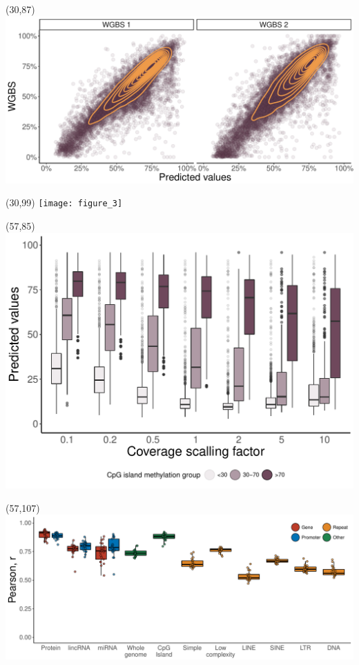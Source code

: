 \documentclass[a0,50pt]{a0poster}
\begin{document}
    \begin{textblock}{0}(30,87)
        \includegraphics{figure_2}
    \end{textblock}
    \begin{textblock}{0}(30,99)
        \texttt{[image: figure\_3]}
    \end{textblock}
    \begin{textblock}{0}(57,85)
        \includegraphics{figure_4}
    \end{textblock}
    \begin{textblock}{0}(57,107)
        \includegraphics{figure_5}
    \end{textblock}
\end{document}
